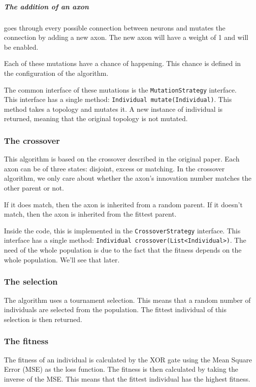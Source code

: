 \documentclass[a4paper, 12pt]{article}
\begin{document}
\subparagraph{The addition of an axon} goes through every possible connection between neurons and mutates the connection by adding a new axon. The new axon will have a weight of 1 and will be enabled.

Each of these mutations have a chance of happening. This chance is defined in the configuration of the algorithm.

The common interface of these mutations is the \texttt{MutationStrategy} interface. This interface has a single method: \texttt{Individual mutate(Individual)}. This method takes a topology and mutates it. A new instance of individual is returned, meaning that the original topology is not mutated.

\subsubsection*{The crossover}

This algorithm is based on the crossover described in the original paper. Each axon can be of three states: disjoint, excess or matching. In the crossover algorithm, we only care about whether the axon's innovation number matches the other parent or not.

If it does match, then the axon is inherited from a random parent. If it doesn't match, then the axon is inherited from the fittest parent.

Inside the code, this is implemented in the \texttt{CrossoverStrategy} interface. This interface has a single method: \texttt{Individual crossover(List<Individual>)}. The need of the whole population is due to the fact that the fitness depends on the whole population. We'll see that later.

\subsubsection*{The selection}

The algorithm uses a tournament selection. This means that a random number of individuals are selected from the population. The fittest individual of this selection is then returned.

\subsubsection*{The fitness}

The fitness of an individual is calculated by the XOR gate using the Mean Square Error (MSE) as the loss function. The fitness is then calculated by taking the inverse of the MSE. This means that the fittest individual has the highest fitness.
\end{document}
